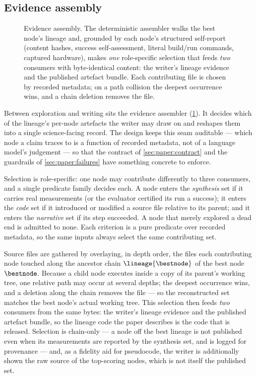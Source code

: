 \subsection{Evidence assembly}\label{sec:paper:evidence}

\begin{figure}[t]
  \centering
  \resizebox{\columnwidth}{!}{}
  \caption{Evidence assembly. The deterministic assembler walks the best
           node's lineage and, grounded by each node's structured
           self-report (content hashes, success self-assessment, literal
           build/run commands, captured hardware), makes \emph{one}
           role-specific selection that feeds \emph{two} consumers with
           byte-identical content: the writer's lineage evidence and the
           published artefact bundle. Each contributing file is chosen by
           recorded metadata; on a path collision the deepest occurrence
           wins, and a chain deletion removes the file.}
  \label{fig:evidence}
\end{figure}

Between exploration and writing sits the evidence assembler
(\cref{fig:evidence}). It decides which of the lineage's per-node
artefacts the writer may draw on and reshapes them into a single
science-facing record. The design keeps this seam auditable --- which
node a claim traces to is a function of recorded metadata, not of a
language model's judgement --- so that the contract of
\cref{sec:paper:contract} and the guardrails of
\cref{sec:paper:failures} have something concrete to enforce.

Selection is role-specific: one node may contribute differently to
three consumers, and a single predicate family decides each. A node
enters the \emph{synthesis} set if it carries real measurements (or the
evaluator certified its run a success); it enters the \emph{code} set if
it introduced or modified a source file relative to its parent; and it
enters the \emph{narrative} set if its step succeeded. A node that
merely explored a dead end is admitted to none. Each criterion is a
pure predicate over recorded metadata, so the same inputs always select
the same contributing set.

Source files are gathered by overlaying, in depth order, the files each
contributing node touched along the ancestor chain $\lineage{\bestnode}$
of the best node $\bestnode$. Because a child node executes inside a copy
of its parent's working tree, one relative path may occur at several
depths; the deepest occurrence wins, and a deletion along the chain
removes the file --- so the reconstructed set matches the best node's
actual working tree. This selection then feeds \emph{two} consumers from
the same bytes: the writer's lineage evidence and the published artefact
bundle, so the lineage code the paper describes is the code that is
released. Selection is chain-only --- a node off the best lineage is not
published even when its measurements are reported by the synthesis set,
and is logged for provenance --- and, as a fidelity aid for pseudocode,
the writer is additionally shown the raw source of the top-scoring nodes,
which is not itself the published set.

